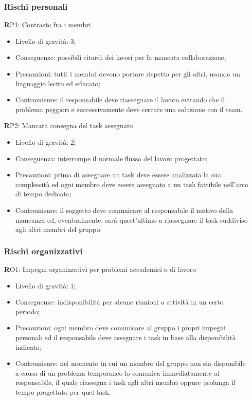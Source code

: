 \subsubsection{Rischi personali}
\textbf RP1: 
Contrasto fra i membri
\begin{itemize}
\item Livello di gravità: 3;
\item Conseguenze: possibili ritardi dei lavori per la mancata collaborazione;
\item Precauzioni: tutti i membri devono portare rispetto per gli altri, usando un linguaggio lecito ed educato;
\item Contromisure: il responsabile deve riassegnare il lavoro evitando che il problema peggiori e successivamente deve cercare una soluzione con il team.
\end{itemize}
\textbf RP2:
Mancata consegna del task assegnato
\begin{itemize}
\item Livello di gravità: 2;
\item Conseguenza: interrompe il normale flusso del lavoro progettato;
\item Precauzioni: prima di assegnare un task deve essere analizzata la sua complessità ed ogni membro deve essere assegnato a un task fattibile nell'arco di tempo dedicato;
\item Contromisure: il soggetto deve comunicare al responsabile il motivo della mancanza ed, eventualmente, sarà quest'ultimo a riassegnare il task suddiviso agli altri membri del gruppo.
\end{itemize}

\subsubsection{Rischi organizzativi}
\textbf RO1: 
Impegni organizzativi per problemi accademici o di lavoro
\begin{itemize}
\item Livello di gravità: 1;
\item Conseguenze: indisponibilità per alcune riunioni o attività in un certo periodo;
\item Precauzioni: ogni membro deve comunicare al gruppo i propri impegni personali ed il responsabile deve assegnare i task in base alla disponibilità indicata;
\item Contromisure: nel momento in cui un membro del gruppo non sia disponibile a causa di un problema temporaneo lo comunica immediatamente al responsabile, il quale riassegna i task agli altri membri oppure prolunga il tempo progettato per quel task.
\end{itemize}

